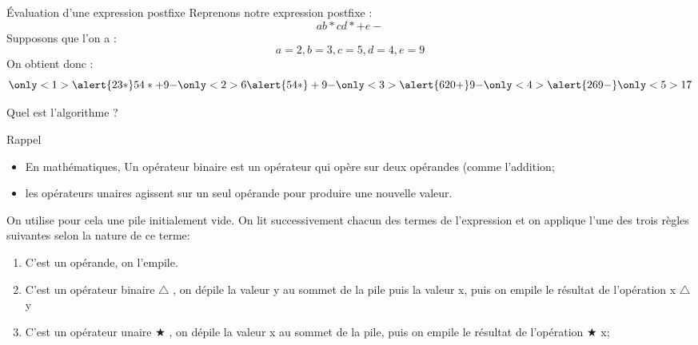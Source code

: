 \documentclass[10pt,xcolor=dvipsnames]{beamer}
\begin{document}
\begin{frame}{Évaluation d'une expression postfixe}
    Reprenons notre expression postfixe :
    \begin{equation*}
        a b * c d * + e -
    \end{equation*}
    Supposons que l'on a :
    \begin{equation*}
        a=2, b=3, c=5, d=4, e=9
    \end{equation*}
    On obtient donc :
    \begin{equation*}
        \only<1>{
        \alert{2 3 *} 5 4 * + 9 -
        }
        \only<2>{
        6 \alert{5 4 *} + 9 -
        }
        \only<3>{
        \alert{6 20 +} 9 -
        }
        \only<4>{
        \alert{26 9 -}
        }
        \only<5>{
        17
        }
    \end{equation*}
\end{frame}

\begin{frame}{Quel est l'algorithme ?}
\begin{exampleblock}{Rappel}
\begin{itemize}
    \item En mathématiques, Un opérateur binaire est un opérateur qui opère sur deux opérandes (comme l'addition;
    \item les opérateurs unaires agissent sur un seul opérande pour produire une nouvelle valeur.
\end{itemize}
\end{exampleblock}
    On utilise pour cela une \alert{pile} initialement vide. On lit successivement chacun des termes de l'expression et on applique l'une des trois règles suivantes selon la nature de ce terme:

\begin{enumerate}
    \item C'est un opérande, on l'empile.
    \item C'est un opérateur binaire $\triangle$ , on dépile la valeur y au sommet de la pile puis la valeur x, puis on empile le résultat de l'opération x $\triangle$ y
    \item C'est un opérateur unaire $\bigstar$ , on dépile la valeur x au sommet de la pile, puis on empile le résultat de l'opération $\bigstar$ x;
\end{enumerate}
\end{frame}
\end{document}
